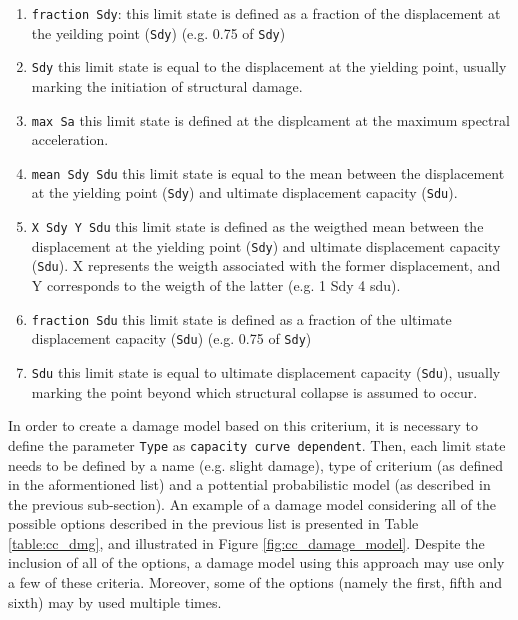 \begin{enumerate}
 \item \verb=fraction Sdy=: this limit state is defined as a fraction of the displacement at the yeilding point (\verb=Sdy=) (e.g. 0.75 of \verb=Sdy=)
 \item \verb=Sdy= this limit state is equal to the displacement at the yielding point, usually marking the initiation of structural damage.
 \item \verb=max Sa= this limit state is defined at the displcament at the maximum spectral acceleration. 
 \item \verb=mean Sdy Sdu= this limit state is equal to the mean between the displacement at the yielding point (\verb=Sdy=) and ultimate displacement capacity (\verb=Sdu=).
 \item \verb=X Sdy Y Sdu= this limit state is defined as the weigthed mean between the displacement at the yielding point (\verb=Sdy=) and ultimate displacement capacity (\verb=Sdu=). X represents the weigth associated with the former displacement, and Y corresponds to the weigth of the latter (e.g. 1 Sdy 4 sdu).
 \item \verb=fraction Sdu= this limit state is defined as a fraction of the ultimate displacement capacity (\verb=Sdu=) (e.g. 0.75 of \verb=Sdy=)
 \item \verb=Sdu= this limit state is equal to ultimate displacement capacity (\verb=Sdu=), usually marking the point beyond which structural collapse is assumed to occur.\\
\end{enumerate}

In order to create a damage model based on this criterium, it is necessary to define the parameter \verb=Type= as \verb=capacity curve dependent=. Then, each limit state needs to be defined by a name (e.g. slight damage), type of criterium (as defined in the aformentioned list) and a pottential probabilistic model (as described in the previous sub-section). An example of a damage model considering all of the possible options described in the previous list is presented in Table \ref{table:cc_dmg}, and illustrated in Figure \ref{fig:cc_damage_model}. Despite the inclusion of all of the options, a damage model using this approach may use only a few of these criteria. Moreover, some of the options (namely the first, fifth and sixth) may by used multiple times.

